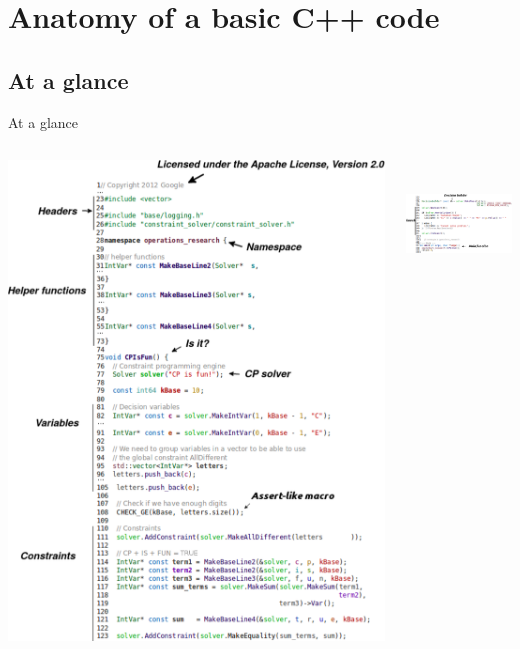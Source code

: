 \documentclass[utf8x,xcolor=dvipsnames]{beamer}
\begin{document}
\section{Anatomy of a basic C++ code}
\subsection{At a glance}

\begin{frame}[shrink]{At a glance}
 \begin{columns}
 \begin{column}{0.45\textwidth}
 \includegraphics[height=0.9\textheight]{images/anatomy1.pdf}
\end{column}
 \begin{column}{0.45\textwidth}
\includegraphics[height=95pt]{images/anatomy2.pdf}
\end{column}
\end{columns}
\end{frame}
\end{document}
